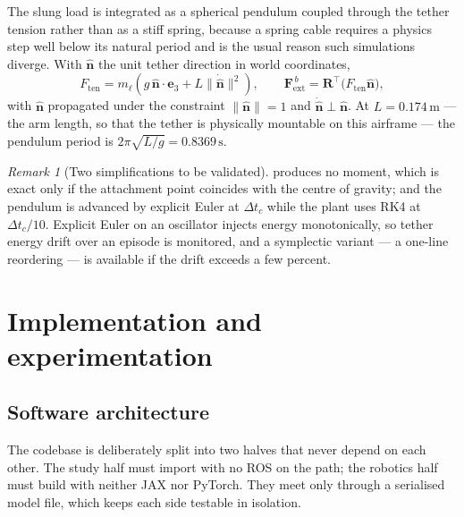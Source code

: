 \documentclass[11pt,a4paper,twoside,openright]{report}
\newcommand{\vTether}{0.174}             %
\newcommand{\vTetherT}{0.8369}           %
\newcommand{\transp}{^{\!\top}}
\renewcommand{\vec}[1]{\bm{#1}}
\newcommand{\mat}[1]{\bm{#1}}
\theoremstyle{plain}
\theoremstyle{definition}
\theoremstyle{remark}
\newtheorem{remark}[theorem]{Remark}
\begin{document}
	The slung load is integrated as a spherical pendulum coupled through the tether
	tension rather than as a stiff spring, because a spring cable requires a physics
	step well below its natural period and is the usual reason such simulations
	diverge. With $\hat{\vec n}$ the unit tether direction in world coordinates,
	\begin{equation}
		F_\mathrm{ten}=m_\ell\!\left(g\,\hat{\vec n}\cdot\vec e_3+L\|\dot{\hat{\vec n}}\|^2\right),
		\qquad
		\vec F^{\,b}_\mathrm{ext}=\mat R\transp\big(F_\mathrm{ten}\hat{\vec n}\big),
		\label{eq:tether}
	\end{equation}
	with $\hat{\vec n}$ propagated under the constraint $\|\hat{\vec n}\|=1$ and
	$\dot{\hat{\vec n}}\perp\hat{\vec n}$. At $L=\vTether\,\si{\metre}$ --- the arm
	length, so that the tether is physically mountable on this airframe --- the
	pendulum period is $2\pi\sqrt{L/g}=\vTetherT\,\si{\second}$.

	\begin{remark}[Two simplifications to be validated]
		 produces no moment, which is exact only if the attachment point
		coincides with the centre of gravity; and the pendulum is advanced by explicit
		Euler at $\Delta t_c$ while the plant uses RK4 at $\Delta t_c/10$. Explicit Euler
		on an oscillator injects energy monotonically, so tether energy drift over an
		episode is monitored, and a symplectic variant --- a one-line reordering --- is
		available if the drift exceeds a few percent.
	\end{remark}
	\chapter{Implementation and experimentation}
	\label{ch:impl}

	\section{Software architecture}

	The codebase is deliberately split into two halves that never depend on each
	other. The study half must import with no ROS on the path; the robotics half
	must build with neither JAX nor PyTorch. They meet only through a serialised
	model file, which keeps each side testable in isolation.
\end{document}
